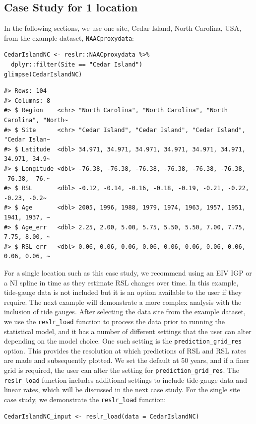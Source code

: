 \subsection{Case Study for 1 location}\label{casestudy1}
In the following sections, we use one site, Cedar Island, North Carolina, USA, from the example dataset, \texttt{NAACproxydata}:
\scriptsize
\begin{verbatim}
CedarIslandNC <- reslr::NAACproxydata %>% 
  dplyr::filter(Site == "Cedar Island")
glimpse(CedarIslandNC)
\end{verbatim}
\begin{verbatim}
#> Rows: 104
#> Columns: 8
#> $ Region    <chr> "North Carolina", "North Carolina", "North Carolina", "North~
#> $ Site      <chr> "Cedar Island", "Cedar Island", "Cedar Island", "Cedar Islan~
#> $ Latitude  <dbl> 34.971, 34.971, 34.971, 34.971, 34.971, 34.971, 34.971, 34.9~
#> $ Longitude <dbl> -76.38, -76.38, -76.38, -76.38, -76.38, -76.38, -76.38, -76.~
#> $ RSL       <dbl> -0.12, -0.14, -0.16, -0.18, -0.19, -0.21, -0.22, -0.23, -0.2~
#> $ Age       <dbl> 2005, 1996, 1988, 1979, 1974, 1963, 1957, 1951, 1941, 1937, ~
#> $ Age_err   <dbl> 2.25, 2.00, 5.00, 5.75, 5.50, 5.50, 7.00, 7.75, 7.75, 8.00, ~
#> $ RSL_err   <dbl> 0.06, 0.06, 0.06, 0.06, 0.06, 0.06, 0.06, 0.06, 0.06, 0.06, ~
\end{verbatim}
\normalsize
For a single location such as this case study, we recommend using an EIV IGP or a NI spline in time as they estimate RSL changes over time. In this example, tide-gauge data is not included but it is an option available to the user if they require. The next example will demonstrate a more complex analysis with the inclusion of tide gauges.
After selecting the data site from the example dataset, we use the \texttt{reslr\_load} function to process the data prior to running the statistical model, and it has a number of different settings that the user can alter depending on the model choice. One such setting is the \texttt{prediction\_grid\_res} option. This provides the resolution at which predictions of RSL and RSL rates are made and subsequently plotted. We set the default at 50 years, and if a finer grid is required, the user can alter the setting for \texttt{prediction\_grid\_res}. The \texttt{reslr\_load} function includes additional settings to include tide-gauge data and linear rates, which will be discussed in the next case study. For the single site case study, we demonstrate the \texttt{reslr\_load} function:
\scriptsize
\begin{verbatim}
CedarIslandNC_input <- reslr_load(data = CedarIslandNC)
\end{verbatim}
